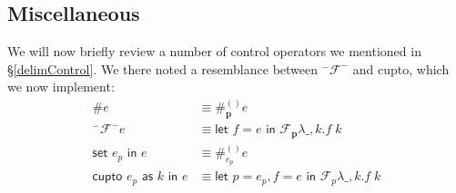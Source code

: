 \documentclass[11pt]{article}
\newcommand{\maybePage}{\null}
\newcommand{\abort}[2]{\textsf{abort}[#1]\;#2}
\newcommand{\letin}[2]{\textsf{let }#1\textsf{ in }#2}
\newcommand\F{\mathcal{F}}
\begin{document}
%
%
%
%

\maybePage
\subsection{Miscellaneous}
\label{subsec:implMisc}

We will now briefly review a number of control operators we mentioned in \S\ref{delimControl}.
We there noted a resemblance between $^-\F^-$ and cupto, which we now implement:
\begin{align*}
\#e &\equiv \#_\mathbf{p}^{()}e \\
^-\F^-e &\equiv
	\letin{f=e}{\F_\mathbf{p}\lambda \_,k.f\;k} \\
%
\textsf{set }e_p\textsf{ in }e &\equiv
	\#_{e_p}^{()}e \\
\textsf{cupto }e_p\textsf{ as }k\textsf{ in }e &\equiv
	\letin{p = e_p,f=e}{\F_p\lambda \_,k.f\;k} \\
\end{align*}
\end{document}
